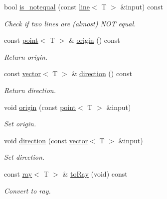 \begin{DoxyCompactItemize}
bool \hyperlink{classddd_1_1line_addea61f32ab9aad4abf390bea633fd3c}{is\+\_\+notequal} (const \hyperlink{classddd_1_1line}{line}$<$ T $>$ \&input) const
\begin{DoxyCompactList}\small\item\em Check if two lines are (almost) N\+OT equal. \end{DoxyCompactList}\item 
\mbox{\label{classddd_1_1line_a229e71bc976e64ac6129d14113a0d529}} 
const \hyperlink{classddd_1_1point}{point}$<$ T $>$ \& \hyperlink{classddd_1_1line_a229e71bc976e64ac6129d14113a0d529}{origin} () const
\begin{DoxyCompactList}\small\item\em Return origin. \end{DoxyCompactList}\item 
\mbox{\label{classddd_1_1line_a49d6c131bbf73688280bafadfd284e8b}} 
const \hyperlink{classddd_1_1vector}{vector}$<$ T $>$ \& \hyperlink{classddd_1_1line_a49d6c131bbf73688280bafadfd284e8b}{direction} () const
\begin{DoxyCompactList}\small\item\em Return direction. \end{DoxyCompactList}\item 
void \hyperlink{classddd_1_1line_a531225ea04ea5f147adf76505ab13bcc}{origin} (const \hyperlink{classddd_1_1point}{point}$<$ T $>$ \&input)
\begin{DoxyCompactList}\small\item\em Set origin. \end{DoxyCompactList}\item 
void \hyperlink{classddd_1_1line_a67a08be8f16587b17cb7a9fb927f9c32}{direction} (const \hyperlink{classddd_1_1vector}{vector}$<$ T $>$ \&input)
\begin{DoxyCompactList}\small\item\em Set direction. \end{DoxyCompactList}\item 
\mbox{\label{classddd_1_1line_a5107d974e903d63524040349be5616f2}} 
const \hyperlink{classddd_1_1ray}{ray}$<$ T $>$ \& \hyperlink{classddd_1_1line_a5107d974e903d63524040349be5616f2}{to\+Ray} (void) const
\begin{DoxyCompactList}\small\item\em Convert to ray. \end{DoxyCompactList}\item 

\end{DoxyCompactItemize}
